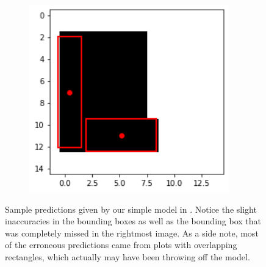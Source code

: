 \begin{figure}[htbp]
\begin{subfigure}{0.32\textwidth}
    \end{subfigure}
    \hfill
    \begin{subfigure}{0.32\textwidth}
        \centering
        \includegraphics[width=0.95\textwidth]{images/faceDetec/loss-function/rectangle-prediction-3.png}
    \end{subfigure}
    \caption{
        Sample predictions given by our simple model in .
        Notice the slight inaccuracies in the bounding boxes as well as the bounding box that was completely missed in the rightmost image.
        As a side note, most of the erroneous predictions came from plots with overlapping rectangles, which actually may have been throwing off the model.
    }
    \label{Figure:Face-Detection:loss-function:rectangles-predictions}
\end{figure}